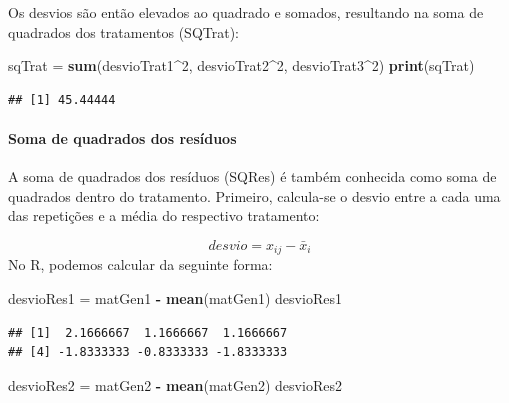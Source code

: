 \documentclass[
]{article}
\newenvironment{Shaded}{\begin{snugshade}}{\end{snugshade}}
\newcommand{\DecValTok}[1]{\textcolor[rgb]{0.00,0.00,0.81}{#1}}
\newcommand{\KeywordTok}[1]{\textcolor[rgb]{0.13,0.29,0.53}{\textbf{#1}}}
\newcommand{\NormalTok}[1]{#1}
\newcommand{\OperatorTok}[1]{\textcolor[rgb]{0.81,0.36,0.00}{\textbf{#1}}}
\newcommand{\StringTok}[1]{\textcolor[rgb]{0.31,0.60,0.02}{#1}}
\begin{document}
Os desvios são então elevados ao quadrado e somados, resultando na soma de quadrados dos tratamentos (SQTrat):

\begin{Shaded}
\begin{Highlighting}[]
\NormalTok{sqTrat =}\StringTok{ }\KeywordTok{sum}\NormalTok{(desvioTrat1}\OperatorTok{^}\DecValTok{2}\NormalTok{, desvioTrat2}\OperatorTok{^}\DecValTok{2}\NormalTok{, desvioTrat3}\OperatorTok{^}\DecValTok{2}\NormalTok{)}
\KeywordTok{print}\NormalTok{(sqTrat)}
\end{Highlighting}
\end{Shaded}

\begin{verbatim}
## [1] 45.44444
\end{verbatim}

\hypertarget{soma-de-quadrados-dos-resuxedduos}{%
\paragraph{Soma de quadrados dos resíduos}\label{soma-de-quadrados-dos-resuxedduos}}

A soma de quadrados dos resíduos (SQRes) é também conhecida como soma de quadrados dentro do tratamento. Primeiro, calcula-se o desvio entre a cada uma das repetições e a média do respectivo tratamento:

\[desvio = x_{ij} - \bar{x}_{i}\]
No R, podemos calcular da seguinte forma:

\begin{Shaded}
\begin{Highlighting}[]
\NormalTok{desvioRes1 =}\StringTok{ }\NormalTok{matGen1 }\OperatorTok{-}\StringTok{ }\KeywordTok{mean}\NormalTok{(matGen1)}
\NormalTok{desvioRes1}
\end{Highlighting}
\end{Shaded}

\begin{verbatim}
## [1]  2.1666667  1.1666667  1.1666667
## [4] -1.8333333 -0.8333333 -1.8333333
\end{verbatim}

\begin{Shaded}
\begin{Highlighting}[]
\NormalTok{desvioRes2 =}\StringTok{ }\NormalTok{matGen2 }\OperatorTok{-}\StringTok{ }\KeywordTok{mean}\NormalTok{(matGen2)}
\NormalTok{desvioRes2}
\end{Highlighting}
\end{Shaded}
\end{document}
